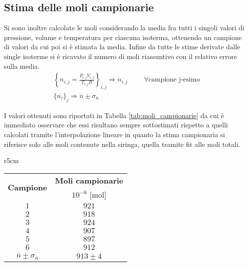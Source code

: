 \documentclass[a4paper,11pt,oneside]{article}
\begin{document}
\subsection{Stima delle moli campionarie}\label{par:moli_campionarie}
Si sono inoltre calcolate le moli considerando la media fra tutti i singoli valori di pressione, volume e temperatura per ciascuna isoterma, ottenendo un campione di valori da cui poi si è stimata la media. Infine da tutte le stime derivate dalle single isoterme si è ricavato il numero di moli riassuntivo con il relativo errore sulla media.
\begin{gather*}
    \left \{n_{i, j}=\frac{P_{i, j}V_{i, j}}{T_{i, j}R}\right \}_{i, j} \Rightarrow \overline{n_{i, j}} \hspace{1cm}\forall \text{campione j-esimo}\\
    \{\overline{n_{i}}\}_{j} \Rightarrow \overline{n}\pm \sigma_{\overline{n}}
\end{gather*}

I valori ottenuti sono riportati in Tabella \ref{tab:moli_campionarie} da cui è immediato osservare che essi risultano sempre sottostimati rispetto a quelli calcolati tramite l'interpolazione lineare in quanto la stima campionaria si riferisce solo alle moli contenute nella siringa, quella tramite fit alle moli totali.

\begin{wraptable}{r}{5cm}
    \begin{tabular}{|c|c|}
        \hline
        \multirow{2}{*}{\textbf{Campione}} & \textbf{Moli campionarie}\\
        & $10^{-6}$ [mol] \\ \hline
        \rowcolor[rgb]{0.85,0.85,0.85}$1$ & $921$ \\ \hline
        $2$ & $918$ \\ \hline
        \rowcolor[rgb]{0.85,0.85,0.85}$3$ & $924$ \\ \hline
        $4$ & $907$ \\ \hline
        \rowcolor[rgb]{0.85,0.85,0.85}$5$ & $897$ \\ \hline
        $6$ & $912$ \\ \hline\hline
        \rowcolor[rgb]{0.85,0.85,0.85}$\overline{n}\pm\sigma_{\overline{n}}$ & $913 \pm 4$ \\ \hline
    \end{tabular}
    \caption{Moli Campionarie}
    \label{tab:moli_campionarie}
\end{wraptable}
\end{document}
